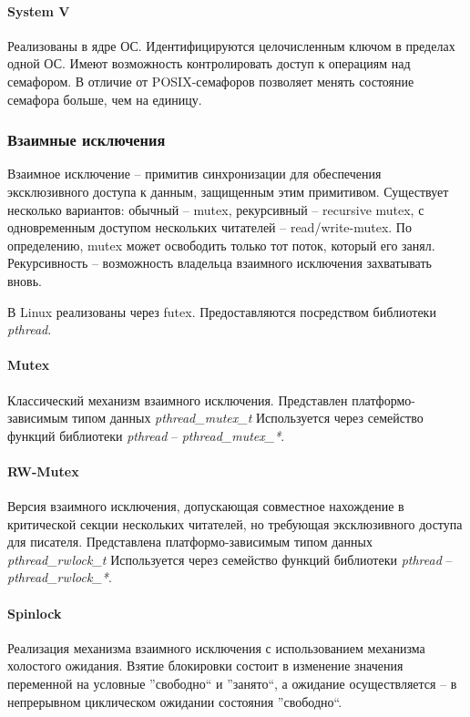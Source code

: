 \paragraph{System V}

Реализованы в ядре ОС. Идентифицируются целочисленным ключом в пределах одной ОС. Имеют возможность контролировать доступ к операциям над семафором. В отличие от POSIX-семафоров позволяет менять состояние семафора больше, чем на единицу.

\subsubsection{Взаимные исключения}

Взаимное исключение -- примитив синхронизации для обеспечения эксклюзивного доступа к данным, защищенным этим примитивом. Существует несколько вариантов: обычный -- mutex, рекурсивный -- recursive mutex, с одновременным доступом нескольких читателей -- read/write-mutex. По определению, mutex может освободить только тот поток, который его занял. Рекурсивность -- возможность владельца взаимного исключения захватывать вновь.

В Linux реализованы через futex. Предоставляются посредством библиотеки \textit{pthread}.

\paragraph{Mutex}
Классический механизм взаимного исключения. Представлен платформо-зависимым типом данных \textit{pthread\_mutex\_t} Используется через семейство функций библиотеки \textit{pthread} -- \textit{pthread\_mutex\_*}.

\paragraph{RW-Mutex}
Версия взаимного исключения, допускающая совместное нахождение в критической секции нескольких читателей, но требующая эксклюзивного доступа для писателя. Представлена платформо-зависимым типом данных \textit{pthread\_rwlock\_t} Используется через семейство функций библиотеки \textit{pthread} -- \textit{pthread\_rwlock\_*}.

\paragraph{Spinlock}
Реализация механизма взаимного исключения с использованием механизма холостого ожидания. Взятие блокировки состоит в изменение значения переменной на условные ''свободно`` и ''занято``, а ожидание осуществляется -- в непрерывном циклическом ожидании состояния ''свободно``.

